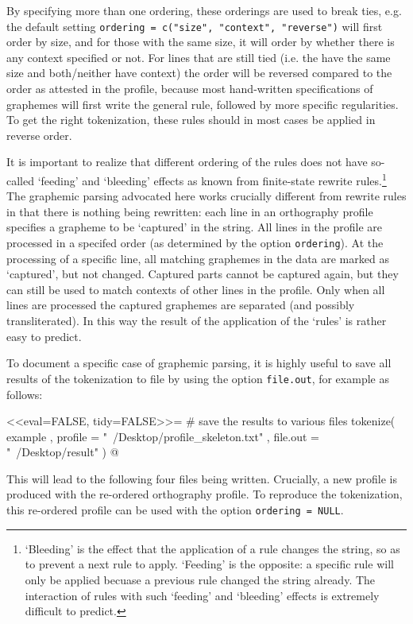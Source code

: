 By specifying more than one ordering, these orderings are used to break ties,
e.g. the default setting \texttt{ordering = c("size", "context", "reverse")}
will first order by size, and for those with the same size, it will order by
whether there is any context specified or not. For lines that are still tied
(i.e. the have the same size and both/neither have context) the order will be
reversed compared to the order as attested in the profile, because most
hand-written specifications of graphemes will first write the general rule,
followed by more specific regularities. To get the right tokenization, these 
rules should in most cases be applied in reverse order.

It is important to realize that different ordering of the rules does not have
so-called `feeding' and `bleeding' effects as known from finite-state rewrite
rules.\footnote{`Bleeding' is the effect that the application of a rule changes
the string, so as to prevent a next rule to apply. `Feeding' is the opposite: a
specific rule will only be applied becuase a previous rule changed the string
already. The interaction of rules with such `feeding' and `bleeding' effects is
extremely difficult to predict.} The graphemic parsing advocated here works
crucially different from rewrite rules in that there is nothing being rewritten:
each line in an orthography profile specifies a grapheme to be `captured' in the 
string. All lines in the profile are processed in a specifed order (as determined
by the option \texttt{ordering}). At the processing of a specific line, all 
matching graphemes in the data are marked as `captured', but not changed. 
Captured parts cannot be captured again, but they can still be used to match 
contexts of other lines in the profile. Only when all lines are processed the 
captured graphemes are separated (and possibly transliterated). In this way the 
result of the application of the `rules' is rather easy to predict.

To document a specific case of graphemic parsing, it is highly useful to save
all results of the tokenization to file by using the option \texttt{file.out},
for example as follows: 

<<eval=FALSE, tidy=FALSE>>= 
# save the results to various files
tokenize( example
         , profile = "~/Desktop/profile_skeleton.txt"
         , file.out = "~/Desktop/result"
        )
@

This will lead to the following four files being written. Crucially, a
new profile is produced with the re-ordered orthography profile. To reproduce
the tokenization, this re-ordered profile can be used with the option
\texttt{ordering~=~NULL}.

